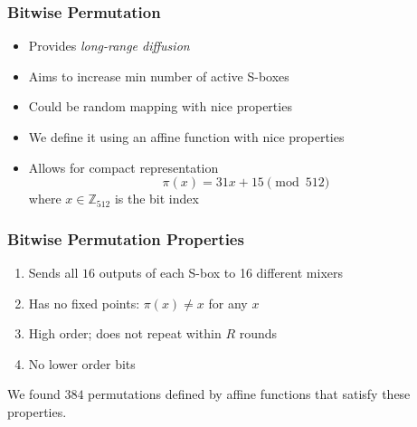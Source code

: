 \begin{frame}
\frametitle{Bitwise Permutation}
\begin{itemize}
  \item Provides \emph{long-range diffusion}
  \item Aims to increase min number of active S-boxes
  \item Could be random mapping with nice properties
  \item We define it using an affine function with nice properties
  \item Allows for compact representation
  \begin{equation*}
  \pi(x) = 31x + 15 \pmod{512}
  \end{equation*}
  where $x \in \mathbb{Z}_{512}$ is the bit index
\end{itemize}
\end{frame}

\begin{frame}
\frametitle{Bitwise Permutation Properties}
\begin{enumerate}
  \item Sends all $16$ outputs of each S-box to 16 different mixers
  \item Has no fixed points: $\pi(x) \ne x$ for any $x$
  \item High order; does not repeat within $R$ rounds
  \item No lower order bits
\end{enumerate}
We found $384$ permutations defined by affine functions that satisfy these properties.
\end{frame}

